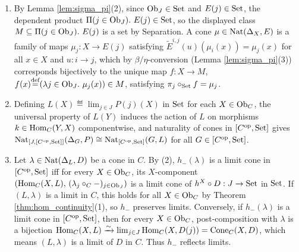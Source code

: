 \documentclass[10pt,a4paper]{article}
\begin{document}
\begin{enumerate}
\item By Lemma \ref{lem:sigma_pi}(2), since ${\textrm{Ob}}_J \in {\textrm{Set}}$ and $E(j) \in {\textrm{Set}}$, the dependent product $\Pi(j \in {\textrm{Ob}}_J).\ E(j) \in {\textrm{Set}}$, so the displayed class $M \subseteq \Pi(j \in {\textrm{Ob}}_J).\ E(j)$ is a set by Separation. A cone $\mu \in {\textrm{Nat}}(\Delta_X, E)$ is a family of maps $\mu_j : X \to E(j)$ satisfying $\widetilde{E}^{i,j}(u)(\mu_i(x)) = \mu_j(x)$ for all $x \in X$ and $u : i \to j$, which by $\beta/\eta$-conversion (Lemma \ref{lem:sigma_pi}(3)) corresponds bijectively to the unique map $f : X \to M$, $f(x) {\stackrel{{\textrm{def}}}{=}} (\lambda j \in {\textrm{Ob}}_J.\ \mu_j(x)) \in M$, satisfying $\pi_j \circ_{\textrm{Set}} f = \mu_j$.
\item Defining $L(X) \eqdef \lim_{j \in J} P(j)(X)$ in ${\textrm{Set}}$ for each $X \in {\textrm{Ob}}_C$, the universal property of $L(Y)$ induces the action of $L$ on morphisms $k \in {\textrm{Hom}}_C(Y, X)$ componentwise, and naturality of cones in $[C^{\textrm{op}}, {\textrm{Set}}]$ gives ${\textrm{Nat}}_{[J,[C^{\textrm{op}},{\textrm{Set}}]]}(\Delta_G, P) \cong {\textrm{Nat}}_{[C^{\textrm{op}},{\textrm{Set}}]}(G, L)$ for all $G \in [C^{\textrm{op}}, {\textrm{Set}}]$.
\item Let $\lambda \in {\textrm{Nat}}(\Delta_L, D)$ be a cone in $C$. By (2), $h_-(\lambda)$ is a limit cone in $[C^{\textrm{op}}, {\textrm{Set}}]$ iff for every $X \in {\textrm{Ob}}_C$, its $X$-component $\left({\textrm{Hom}}_C(X, L),\, (\lambda_j \circ_C -)_{j \in {\textrm{Ob}}_J}\right)$ is a limit cone of $h^X \circ D : J \to {\textrm{Set}}$ in ${\textrm{Set}}$. If $(L, \lambda)$ is a limit in $C$, this holds for all $X \in {\textrm{Ob}}_C$ by Theorem \ref{thm:hom_continuity}(1), so $h_-$ preserves limits. Conversely, if $h_-(\lambda)$ is a limit cone in $[C^{\textrm{op}}, {\textrm{Set}}]$, then for every $X \in {\textrm{Ob}}_C$, post-composition with $\lambda$ is a bijection ${\textrm{Hom}}_C(X, L) \xrightarrow{\sim} \lim_{j \in J} {\textrm{Hom}}_C(X, D(j)) = \mathrm{Cone}_C(X, D)$, which means $(L, \lambda)$ is a limit of $D$ in $C$. Thus $h_-$ reflects limits.
\end{enumerate}
\myqed
\end{document}
